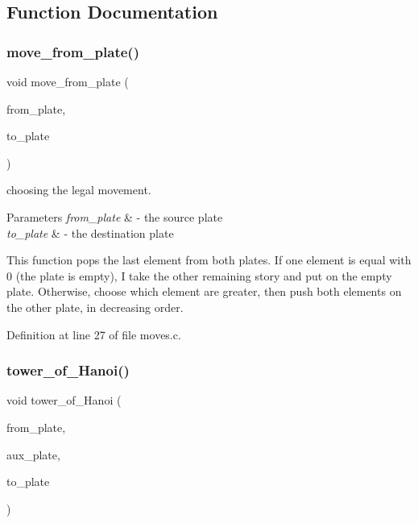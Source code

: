 \subsection{Function Documentation}
\mbox{\label{moves_8c_abd0635f086adec6cecc559bb47aa5097}} 
\subsubsection{move\+\_\+from\+\_\+plate()}
{\footnotesize\ttfamily void move\+\_\+from\+\_\+plate (\begin{DoxyParamCaption}\item[{struct \textbf{ plate} $\ast$}]{from\+\_\+plate,  }\item[{struct \textbf{ plate} $\ast$}]{to\+\_\+plate }\end{DoxyParamCaption})}



choosing the legal movement. 


\begin{DoxyParams}{Parameters}
{\em from\+\_\+plate} & -\/ the source plate \\
\hline
{\em to\+\_\+plate} & -\/ the destination plate\\
\hline
\end{DoxyParams}
This function pops the last element from both plates. If one element is equal with 0 (the plate is empty), I take the other remaining story and put on the empty plate. Otherwise, choose which element are greater, then push both elements on the other plate, in decreasing order. 

Definition at line 27 of file moves.\+c.

\mbox{\label{moves_8c_a00da4ed4ebe79b1c422c86ba72111610}} 
\subsubsection{tower\+\_\+of\+\_\+\+Hanoi()}
{\footnotesize\ttfamily void tower\+\_\+of\+\_\+\+Hanoi (\begin{DoxyParamCaption}\item[{struct \textbf{ plate} $\ast$}]{from\+\_\+plate,  }\item[{struct \textbf{ plate} $\ast$}]{aux\+\_\+plate,  }\item[{struct \textbf{ plate} $\ast$}]{to\+\_\+plate }\end{DoxyParamCaption})}



